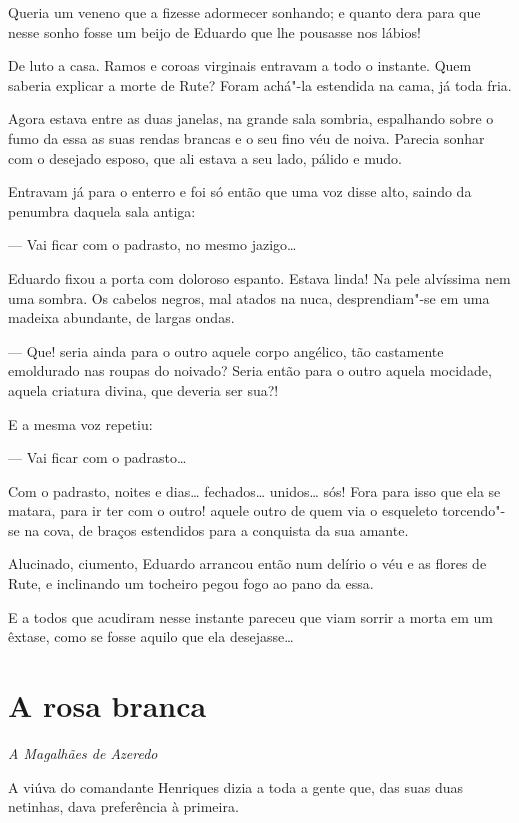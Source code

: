 Queria um veneno que a fizesse adormecer sonhando; e quanto dera para
que nesse sonho fosse um beijo de Eduardo que lhe pousasse nos lábios!

\asterisc

De luto a casa. Ramos e coroas virginais entravam a todo o instante.
Quem saberia explicar a morte de Rute? Foram achá"-la estendida na cama,
já toda fria.

Agora estava entre as duas janelas, na grande sala sombria, espalhando
sobre o fumo da essa as suas rendas brancas e o seu fino véu de noiva.
Parecia sonhar com o desejado esposo, que ali estava a seu lado, pálido
e mudo.

Entravam já para o enterro e foi só então que uma voz disse alto, saindo
da penumbra daquela sala antiga:

--- Vai ficar com o padrasto, no mesmo jazigo\ldots{}

Eduardo fixou a porta com doloroso espanto. Estava linda! Na pele
alvíssima nem uma sombra. Os cabelos negros, mal atados na nuca,
desprendiam"-se em uma madeixa abundante, de largas ondas.

--- Que! seria ainda para o outro aquele corpo angélico, tão castamente
emoldurado nas roupas do noivado? Seria então para o outro aquela
mocidade, aquela criatura divina, que deveria ser sua?!

E a mesma voz repetiu:

--- Vai ficar com o padrasto\ldots{}

Com o padrasto, noites e dias\ldots{} fechados\ldots{} unidos\ldots{} sós! Fora para
isso que ela se matara, para ir ter com o outro! aquele outro de quem
via o esqueleto torcendo"-se na cova, de braços estendidos para a
conquista da sua amante.

Alucinado, ciumento, Eduardo arrancou então num delírio o véu e as
flores de Rute, e inclinando um tocheiro pegou fogo ao pano da essa.

E a todos que acudiram nesse instante pareceu que viam sorrir a morta em
um êxtase, como se fosse aquilo que ela desejasse\ldots{}

\chapter{A rosa branca}

\hfill{}\emph{A Magalhães de Azeredo}

\bigskip

\noindent{}A viúva do comandante Henriques dizia a toda a gente que, das suas duas
netinhas, dava preferência à primeira.

